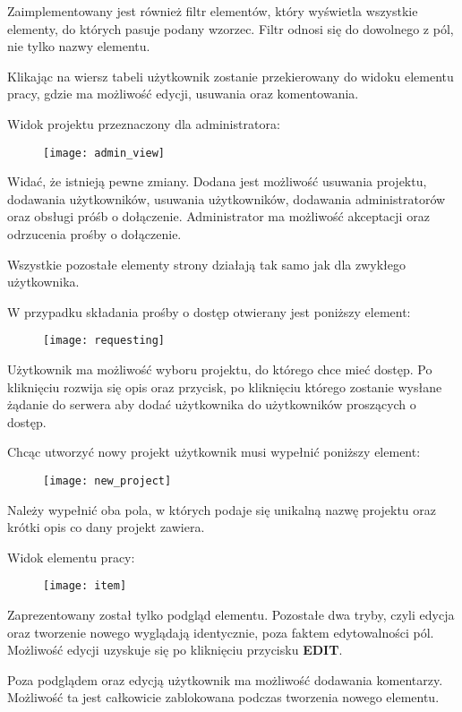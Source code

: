 \documentclass[11pt, titlepage]{article}
\begin{document}
Zaimplementowany jest również filtr elementów, który wyświetla wszystkie elementy,  do których pasuje podany wzorzec. Filtr odnosi się do dowolnego z pól, nie tylko nazwy elementu.

Klikając na wiersz tabeli użytkownik zostanie przekierowany do widoku elementu pracy, gdzie ma możliwość edycji, usuwania oraz komentowania.

\break

Widok projektu przeznaczony dla administratora:

\begin{figure}[H]
\begin{adjustwidth}{-3cm}{}
\texttt{[image: admin\_view]}
\end{adjustwidth}
\end{figure}

Widać, że istnieją pewne zmiany. Dodana jest możliwość usuwania projektu, dodawania użytkowników, usuwania użytkowników, dodawania administratorów oraz obsługi próśb o dołączenie. Administrator ma możliwość akceptacji oraz odrzucenia prośby o dołączenie.

Wszystkie pozostałe elementy strony działają tak samo jak dla zwykłego użytkownika.

\break

W przypadku składania prośby o dostęp otwierany jest poniższy element:

\begin{figure}[H]
\texttt{[image: requesting]}
\end{figure}

Użytkownik ma możliwość wyboru projektu, do którego chce mieć dostęp. Po kliknięciu rozwija się opis oraz przycisk, po kliknięciu którego zostanie wysłane żądanie do serwera aby dodać użytkownika do użytkowników proszących o dostęp.

\break

Chcąc utworzyć nowy projekt użytkownik musi wypełnić poniższy element:

\begin{figure}[H]
\texttt{[image: new\_project]}
\end{figure}

Należy wypełnić oba pola, w których podaje się unikalną nazwę projektu oraz krótki opis co dany projekt zawiera.

\break

Widok elementu pracy:

\begin{figure}[H]
\begin{adjustwidth}{-3cm}{}
\texttt{[image: item]}
\end{adjustwidth}
\end{figure}

Zaprezentowany został tylko podgląd elementu. Pozostałe dwa tryby, czyli edycja oraz tworzenie nowego wyglądają identycznie, poza faktem edytowalności pól. Możliwość edycji uzyskuje się po kliknięciu przycisku \textbf{EDIT}.

Poza podglądem oraz edycją użytkownik ma możliwość dodawania komentarzy. Możliwość ta jest całkowicie zablokowana podczas tworzenia nowego elementu.
\end{document}
